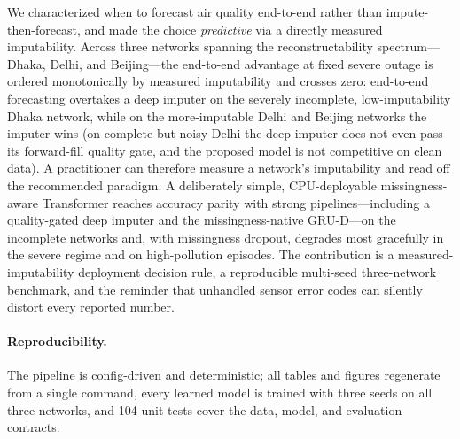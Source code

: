 \documentclass[review,3p,times]{elsarticle}
\begin{document}
We characterized when to forecast air quality end-to-end rather than
impute-then-forecast, and made the choice \emph{predictive} via a directly
measured imputability. Across three networks spanning the reconstructability
spectrum---Dhaka, Delhi, and Beijing---the end-to-end advantage at fixed severe
outage is ordered monotonically by measured imputability and crosses zero:
end-to-end
forecasting overtakes a deep imputer on the severely incomplete, low-imputability
Dhaka network, while on the more-imputable Delhi and Beijing networks the imputer
wins (on complete-but-noisy Delhi the deep imputer does not even pass its
forward-fill quality gate, and the proposed model is not competitive on clean
data). A practitioner can therefore measure a network's imputability and read off
the recommended paradigm. A deliberately simple, CPU-deployable
missingness-aware Transformer reaches accuracy parity with strong
pipelines---including a quality-gated deep imputer and the missingness-native
GRU-D---on the incomplete networks and, with missingness dropout, degrades most
gracefully in the severe regime and on high-pollution episodes. The contribution
is a measured-imputability deployment decision rule, a reproducible multi-seed
three-network benchmark, and the reminder that unhandled sensor error codes can
silently distort every reported number.

\paragraph{Reproducibility.}
The pipeline is config-driven and deterministic; all tables and figures
regenerate from a single command, every learned model is trained with three
seeds on all three networks, and 104 unit tests cover the data, model, and
evaluation contracts.



\end{document}

